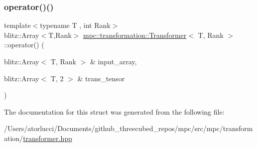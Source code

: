 \subsubsection{\texorpdfstring{operator()()}{operator()()}}
{\footnotesize\ttfamily template$<$typename T , int Rank$>$ \\
blitz\+::\+Array$<$T,Rank$>$ \mbox{\hyperlink{structmpc_1_1transformation_1_1_transformer}{mpc\+::transformation\+::\+Transformer}}$<$ T, Rank $>$\+::operator() (\begin{DoxyParamCaption}\item[{blitz\+::\+Array$<$ T, Rank $>$ \&}]{input\+\_\+array,  }\item[{blitz\+::\+Array$<$ T, 2 $>$ \&}]{trans\+\_\+tensor }\end{DoxyParamCaption})}



The documentation for this struct was generated from the following file\+:\begin{DoxyCompactItemize}
\item 
/\+Users/atorlucci/\+Documents/github\+\_\+threecubed\+\_\+repos/mpc/src/mpc/transformation/\mbox{\hyperlink{transformer_8hpp}{transformer.\+hpp}}\end{DoxyCompactItemize}

